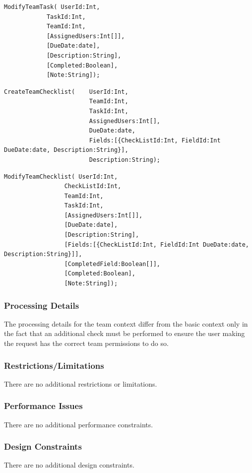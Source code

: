 \documentclass{article}
\begin{document}
\begin{lstlisting}
ModifyTeamTask( UserId:Int,
            TaskId:Int,
            TeamId:Int,
            [AssignedUsers:Int[]],
            [DueDate:date],
            [Description:String],
            [Completed:Boolean],
            [Note:String]);
\end{lstlisting}

\begin{lstlisting}
CreateTeamChecklist(    UserId:Int,
                        TeamId:Int,
                        TaskId:Int,
                        AssignedUsers:Int[],
                        DueDate:date,
                        Fields:[{CheckListId:Int, FieldId:Int DueDate:date, Description:String}],
                        Description:String);
\end{lstlisting}

\begin{lstlisting}
ModifyTeamChecklist( UserId:Int,
                 CheckListId:Int,
                 TeamId:Int,
                 TaskId:Int,
                 [AssignedUsers:Int[]],
                 [DueDate:date],
                 [Description:String],
                 [Fields:[{CheckListId:Int, FieldId:Int DueDate:date, Description:String}]],
                 [CompletedField:Boolean[]],
                 [Completed:Boolean],
                 [Note:String]);
\end{lstlisting}

\subsubsection{Processing Details}
The processing details for the team context differ from the basic context only in the fact that an additional check must be performed to ensure the user making the request has the correct team permissions to do so.
\subsubsection{Restrictions/Limitations}
There are no additional restrictions or limitations.
\subsubsection{Performance Issues}
There are no additional performance constraints.
\subsubsection{Design Constraints}
There are no additional design constraints.
\end{document}
